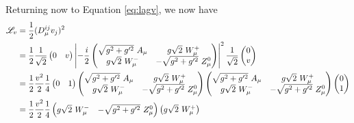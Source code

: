         Returning now to Equation \ref{eq:lagv}, we now have
        \begin{equation} \begin{split}
            \Lag_v & = \frac{1}{2} (D_{\mu}^{ij} v_j)^2 \\
            & = \frac{1}{2}
                \frac{1}{\sqrt{2}} \begin{pmatrix} 0 & v \end{pmatrix}
                \left| -\frac{i}{2}
                    \begin{pmatrix} 
                        \sqrt{g^2 + g^{\prime 2}}\ A_{\mu} & g \sqrt{2}\ W^+_{\mu} \\
                        g \sqrt{2}\ W^-_{\mu} & - \sqrt{g^2 + g^{\prime 2}}\ Z^0_{\mu}
                    \end{pmatrix}
                \right|^2
                \frac{1}{\sqrt{2}} \begin{pmatrix} 0 \\ v \end{pmatrix} \\
            & = \frac{1}{2} \frac{v^2}{2} \frac{1}{4}
                \begin{pmatrix} 0 & 1 \end{pmatrix}
                \begin{pmatrix} 
                    \sqrt{g^2 + g^{\prime 2}}\ A_{\mu} & g \sqrt{2}\ W^+_{\mu} \\
                    g \sqrt{2}\ W^-_{\mu} & - \sqrt{g^2 + g^{\prime 2}}\ Z^0_{\mu}
                \end{pmatrix}
                \begin{pmatrix} 
                    \sqrt{g^2 + g^{\prime 2}}\ A_{\mu} & g \sqrt{2}\ W^+_{\mu} \\
                    g \sqrt{2}\ W^-_{\mu} & - \sqrt{g^2 + g^{\prime 2}}\ Z^0_{\mu}
                \end{pmatrix}
                \begin{pmatrix} 0 \\ 1 \end{pmatrix} \\
            & = \frac{1}{2} \frac{v^2}{2} \frac{1}{4}
                \begin{pmatrix} 
                    g \sqrt{2}\ W^-_{\mu} & - \sqrt{g^2 + g^{\prime 2}}\ Z^0_{\mu}
                \end{pmatrix}
                \begin{pmatrix} 
                     g \sqrt{2}\ W^+_{\mu} \\

\end{pmatrix}
\end{split}
\end{equation}

